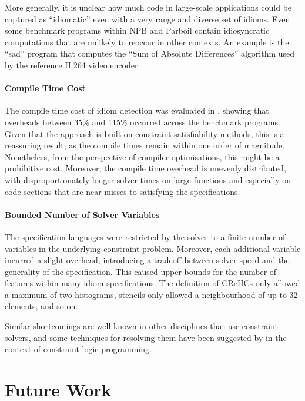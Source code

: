     More generally, it is unclear how much code in large-scale applications
    could be captured as ``idiomatic'' even with a very range and diverse set of
    idioms.
    Even some benchmark programs within NPB and Parboil contain idiosyncratic
    computations that are unlikely to reoccur in other contexts.
    An example is the ``sad'' program that computes the
    ``Sum of Absolute Differences'' algorithm used by the reference H.264 video
    encoder.

\paragraph*{Compile Time Cost}

    The compile time cost of idiom detection was evaluated in
    , showing that overheads between 35$\%$ and 115$\%$
    occurred across the benchmark programs.
    Given that the approach is built on constraint satisfiability methods, this
    is a reassuring result, as the compile times remain within one order of
    magnitude.
    Nonetheless, from the perspective of compiler optimisations, this might be
    a prohibitive cost.
    Moreover, the compile time overhead is unevenly distributed, with
    disproportionately longer solver times on large functions and especially on
    code sections that are near misses to satisfying the specifications.

    \paragraph*{Bounded Number of Solver Variables}
    The specification languages were restricted by the solver to a finite number
    of variables in the underlying constraint problem.
    Moreover, each additional variable incurred a slight overhead, introducing
    a tradeoff between solver speed and the generality of the specification.
    This caused upper bounds for the number of features within many idiom
    specifications:
    The definition of CReHCs only allowed a maximum of two histograms, stencils
    only allowed a neighbourhood of up to 32 elements, and so on.

    Similar shortcomings are well-known in other disciplines that use constraint
    solvers, and some techniques for resolving them have been suggested by
    \citet{Krings2016Constraint} in the context of constraint logic programming.

\section{Future Work}


